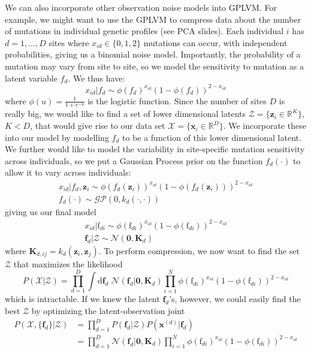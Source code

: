\documentclass[a4paper]{article}
\begin{document}
We can also incorporate other observation noise models into GPLVM. For example, we might want to use the GPLVM to compress data about the number of mutations in individual genetic profiles (see PCA slides). Each individual $i$ has $d=1,\ldots,D$ sites where $x_{id} \in \{0,1,2\}$ mutations can occur, with independent probabilities, giving us a binomial noise model. Importantly, the probability of a mutation may vary from site to site, so we model the sensitivity to mutation as a latent variable $f_d$. We thus have:
\[ x_{id}|f_d \sim \phi(f_d)^{x_{id}}(1-\phi(f_d))^{2-x_{id}} \]
where $\phi(u) = \frac{1}{1+e^{-u}}$ is the logistic function. Since the number of sites $D$ is really big, we would like to find a set of lower dimensional latents $\mathcal{Z} = \{\mathbf{z}_i\in\mathbb{R}^K\}$, $K<D$, that would give rise to our data set $\mathcal{X} = \{\mathbf{x}_i \in \mathbb{R}^D\}$. We incorporate these into our model by modelling $f_d$ to be a function of this lower dimensional latent. We further would like to model the variability in site-specific mutation sensitivity across individuals, so we put a Gaussian Process prior on the function $f_d(\cdot)$ to allow it to vary across individuals:
\begin{gather*}
x_{id}|f_d,\mathbf{z}_i \sim \phi(f_d(\mathbf{z}_i))^{x_{id}}(1-\phi(f_d(\mathbf{z}_i)))^{2-x_{id}} \\
f_d(\cdot) \sim \mathcal{GP}(0,k_d(\cdot,\cdot))
\end{gather*}
giving us our final model
\begin{gather*}
x_{id}|\textrm{f}_{di} \sim \phi(\textrm{f}_{di})^{x_{id}}(1-\phi(\textrm{f}_{di}))^{2-x_{id}} \\
\mathbf{f}_d|\mathcal{Z} \sim \mathcal{N}(\mathbf{0},\mathbf{K}_d)
\end{gather*}
where $\mathbf{K}_{d,ij} = k_d(\mathbf{z}_i,\mathbf{z}_j)$. To perform compression, we now want to find the set $\mathcal{Z}$ that maximizes the likelihood
\[ P(\mathcal{X}|\mathcal{Z}) = \prod_{d=1}^D \int \textrm{d}\mathbf{f}_d\; \mathcal{N}(\mathbf{f}_d|\mathbf{0},\mathbf{K}_d) \prod_{i=1}^N \phi(\textrm{f}_{di})^{x_{id}}(1-\phi(\textrm{f}_{di}))^{2-x_{id}} \]
which is intractable. If we knew the latent $\mathbf{f}_d$'s, however, we could easily find the best $\mathcal{Z}$ by optimizing the latent-observation joint
\begin{align*}
P(\mathcal{X},\{\mathbf{f}_d\}|\mathcal{Z}) &= \prod_{d=1}^D P(\mathbf{f}_d|\mathcal{Z})P(\mathbf{x}^{(d)}|\mathbf{f}_d) \\
&= \prod_{d=1}^D \mathcal{N}(\mathbf{f}_d|\mathbf{0},\mathbf{K}_d) \prod_{i=1}^N \phi(\textrm{f}_{di})^{x_{id}}(1-\phi(\textrm{f}_{di}))^{2-x_{id}}
\end{align*}
\end{document}
